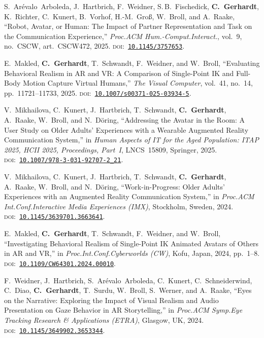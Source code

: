 \documentclass[11pt,a4paper]{article}
\newcommand{\doilink}[1]{\textsc{doi:}~\href{https://doi.org/#1}{\nolinkurl{#1}}}
\begin{document}
\begin{enumerate}[label={[\arabic*]}, leftmargin=2.5em, itemsep=6pt, resume]

\item S.~Ar\'evalo~Arboleda, J.~Hartbrich, F.~Weidner, S.\,B.~Fischedick, \textbf{C.~Gerhardt}, K.~Richter, C.~Kunert, B.~Vorhof, H.-M.~Gro\ss, W.~Broll, and A.~Raake,
``Robot, Avatar, or Human: The Impact of Partner Representation and Task on the Communication Experience,''
\emph{Proc.\@ ACM Hum.-Comput.\@ Interact.}, vol.~9, no.~CSCW, art.~CSCW472, 2025.
\doilink{10.1145/3757653}.

\item E.~Makled, \textbf{C.~Gerhardt}, T.~Schwandt, F.~Weidner, and W.~Broll,
``Evaluating Behavioral Realism in AR and VR: A Comparison of Single-Point IK and Full-Body Motion Capture Virtual Humans,''
\emph{The Visual Computer}, vol.~41, no.~14, pp.~11721--11733, 2025.
\doilink{10.1007/s00371-025-03934-5}.

\item V.~Mikhailova, C.~Kunert, J.~Hartbrich, T.~Schwandt, \textbf{C.~Gerhardt}, A.~Raake, W.~Broll, and N.~D\"oring,
``Addressing the Avatar in the Room: A User Study on Older Adults' Experiences with a Wearable Augmented Reality Communication System,''
in \emph{Human Aspects of IT for the Aged Population: ITAP 2025, HCII 2025, Proceedings, Part~I},
LNCS~15809, Springer, 2025.
\doilink{10.1007/978-3-031-92707-2\_21}.

\item V.~Mikhailova, C.~Kunert, J.~Hartbrich, T.~Schwandt, \textbf{C.~Gerhardt}, A.~Raake, W.~Broll, and N.~D\"oring,
``Work-in-Progress: Older Adults' Experiences with an Augmented Reality Communication System,''
in \emph{Proc.\@ ACM Int.\@ Conf.\@ Interactive Media Experiences (IMX)},
Stockholm, Sweden, 2024.
\doilink{10.1145/3639701.3663641}.

\item E.~Makled, \textbf{C.~Gerhardt}, T.~Schwandt, F.~Weidner, and W.~Broll,
``Investigating Behavioral Realism of Single-Point IK Animated Avatars of Others in AR and VR,''
in \emph{Proc.\@ Int.\@ Conf.\@ Cyberworlds (CW)},
Kofu, Japan, 2024, pp.~1--8.
\doilink{10.1109/CW64301.2024.00010}.

\item F.~Weidner, J.~Hartbrich, S.~Ar\'evalo~Arboleda, C.~Kunert, C.~Schneiderwind, C.~Diao, \textbf{C.~Gerhardt}, T.~Surdu, W.~Broll, S.~Werner, and A.~Raake,
``Eyes on the Narrative: Exploring the Impact of Visual Realism and Audio Presentation on Gaze Behavior in AR Storytelling,''
in \emph{Proc.\@ ACM Symp.\@ Eye Tracking Research \& Applications (ETRA)},
Glasgow, UK, 2024.
\doilink{10.1145/3649902.3653344}.


\end{enumerate}
\end{document}
